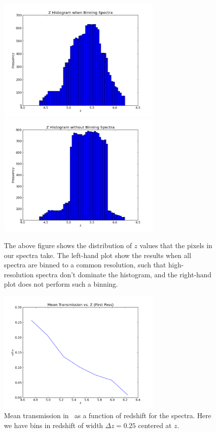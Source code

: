 \documentclass[11pt]{article}
\begin{document}
\begin{figure}[h]
  \centering
  \includegraphics[width=8cm]{zHist_binned.png}
  \includegraphics[width=8cm]{zHist_unbinned.png}
  \caption{The above figure shows the distribution of $z$ values that the pixels in our spectra take. The left-hand plot show the results when all spectra are binned to a common resolution, such that high-resolution spectra don't dominate the histogram, and the right-hand plot does not perform such a binning.}
  \label{fig:todo}
\end{figure}

\begin{figure}[h]
  \centering
  \includegraphics[width=8cm]{FvsZ.png}
  \caption{Mean transmission in \lya\ as a function of redshift for the spectra. Here we have bins in redshift of width $\Delta z = 0.25$ centered at $z$.}
  \label{fig:todo}
\end{figure}
\end{document}
